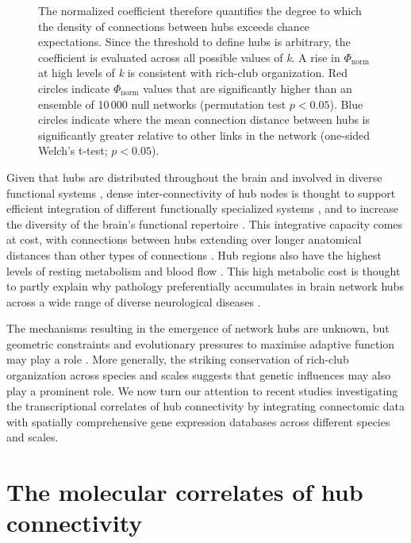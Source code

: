 \begin{figure}[h!]
{The normalized coefficient therefore quantifies the degree to which the density of connections between hubs exceeds chance expectations. Since the threshold to define hubs is arbitrary, the coefficient is evaluated across all possible values of \textit{k}. 
A rise in $\Phi_\mathrm{norm}$ at high levels of \textit{k} is consistent with rich-club organization. Red circles indicate $\Phi_\mathrm{norm}$ values that are significantly higher than an ensemble of 10\,000 null networks (permutation test $p < 0.05$). 
Blue circles indicate where the mean connection distance between hubs is significantly greater relative to other links in the network (one-sided Welch’s t-test; $p < 0.05$). }\label{fig:Ch3Fig2}
\end{figure}

Given that hubs are distributed throughout the brain and involved in diverse functional systems \citep{DeReus2013b,VandenHeuvel2013a,Fulcher2016}, dense inter-connectivity of hub nodes is thought to support efficient integration of different functionally specialized systems \citep{VandenHeuvel2012}, and to increase the diversity of the brain’s functional repertoire \citep{Senden2014}. 
This integrative capacity comes at cost, with connections between hubs extending over longer anatomical distances than other types of connections \citep{VandenHeuvel2011,Harriger2012,Fulcher2016,Arnatkeviciute2018}. 
Hub regions also have the highest levels of resting metabolism \citep{Vaishnavi2010,Tomasi2013} and blood flow \citep{Liang2013a}. 
This high metabolic cost is thought to partly explain why pathology preferentially accumulates in brain network hubs across a wide range of diverse neurological diseases \citep{Bullmore2012,Crossley2014,Fornito2015}. 

The mechanisms resulting in the emergence of network hubs are unknown, but geometric constraints and evolutionary pressures to maximise adaptive function may play a role \citep{Henderson2014,Roberts2016,Betzel2017}. More generally, the striking conservation of rich-club organization across species and scales suggests that genetic influences may also play a prominent role. We now turn our attention to recent studies investigating the transcriptional correlates of hub connectivity by integrating connectomic data with spatially comprehensive gene expression databases across different species and scales. 

\section{The molecular correlates of hub connectivity}


